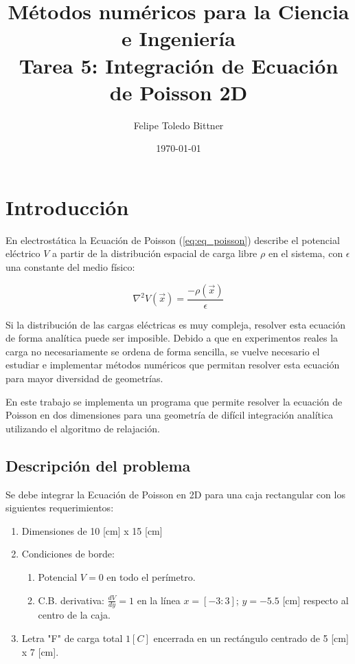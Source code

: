 \documentclass{article}
\title{M\'etodos num\'ericos para la Ciencia e Ingenier\'ia \\ Tarea 5: Integraci\'on de Ecuación de Poisson 2D} %
\author{Felipe Toledo Bittner} %
\date{\today} %
\begin{document}
\maketitle %


\section{Introducción}

En electrostática la Ecuación de Poisson (\ref{eq:eq_poisson}) describe el potencial eléctrico $V$ a partir de la distribución espacial de carga libre $\rho$ en el sistema, con $\epsilon$ una constante del medio físico:

\begin{equation}
  \nabla^2 V(\vec{x}) = \frac{-\rho(\vec{x})}{\epsilon}
  \label{eq:eq_poisson}
\end{equation}

Si la distribución de las cargas eléctricas es muy compleja, resolver esta ecuación de forma analítica puede ser imposible. Debido a que en experimentos reales la carga no necesariamente se ordena de forma sencilla, se vuelve necesario el estudiar e implementar métodos numéricos que permitan resolver esta ecuación para mayor diversidad de geometrías.

En este trabajo se implementa un programa que permite resolver la ecuación de Poisson en dos dimensiones para una geometría de difícil integración analítica utilizando el algoritmo de relajación.

\subsection{Descripción del problema}

Se debe integrar la Ecuación de Poisson en 2D para una caja rectangular con los siguientes requerimientos:

\begin{enumerate}
  \item Dimensiones de 10 [cm] x 15 [cm]
  \item Condiciones de borde: 
  \begin{enumerate}
    \item Potencial $V = 0$ en todo el perímetro.
    \item C.B. derivativa: $\frac{dV}{dy} = 1$ en la línea $x = [-3:3]$; $y = -5.5$ [cm] respecto al centro de la caja.
  \end{enumerate}
  \item Letra "F" de carga total $1[C]$ encerrada en un rectángulo centrado de 5 [cm] x 7 [cm].
\end{enumerate}
\end{document}
